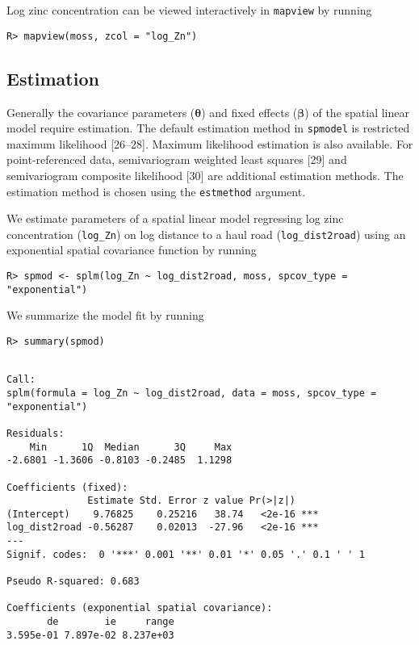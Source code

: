 \documentclass[10pt,letterpaper]{article}
\begin{document}
\noindent Log zinc concentration can be viewed interactively in
\texttt{mapview} by running

\begin{verbatim}
R> mapview(moss, zcol = "log_Zn")
\end{verbatim}

\hypertarget{estimation}{%
\subsection{Estimation}\label{estimation}}

Generally the covariance parameters (\(\boldsymbol{\theta}\)) and fixed
effects (\(\boldsymbol{\beta}\)) of the spatial linear model require
estimation. The default estimation method in \texttt{spmodel} is
restricted maximum likelihood {[}26--28{]}. Maximum likelihood
estimation is also available. For point-referenced data, semivariogram
weighted least squares {[}29{]} and semivariogram composite likelihood
{[}30{]} are additional estimation methods. The estimation method is
chosen using the \texttt{estmethod} argument.

We estimate parameters of a spatial linear model regressing log zinc
concentration (\texttt{log\_Zn}) on log distance to a haul road
(\texttt{log\_dist2road}) using an exponential spatial covariance
function by running

\begin{verbatim}
R> spmod <- splm(log_Zn ~ log_dist2road, moss, spcov_type = "exponential")
\end{verbatim}

\noindent We summarize the model fit by running

\begin{verbatim}
R> summary(spmod)
\end{verbatim}

\begin{verbatim}

Call:
splm(formula = log_Zn ~ log_dist2road, data = moss, spcov_type = "exponential")

Residuals:
    Min      1Q  Median      3Q     Max 
-2.6801 -1.3606 -0.8103 -0.2485  1.1298 

Coefficients (fixed):
              Estimate Std. Error z value Pr(>|z|)    
(Intercept)    9.76825    0.25216   38.74   <2e-16 ***
log_dist2road -0.56287    0.02013  -27.96   <2e-16 ***
---
Signif. codes:  0 '***' 0.001 '**' 0.01 '*' 0.05 '.' 0.1 ' ' 1

Pseudo R-squared: 0.683

Coefficients (exponential spatial covariance):
       de        ie     range 
3.595e-01 7.897e-02 8.237e+03 
\end{verbatim}
\end{document}
